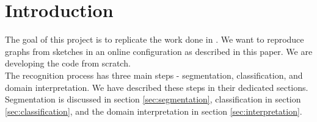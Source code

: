 \section{Introduction}

The goal of this project is to replicate the work done in \citeauthor{daly2015hand} \cite{daly2015hand}. We want to reproduce graphs from sketches in an online configuration as described in this paper. We are developing the code from scratch.\\

The recognition process has three main steps - segmentation, classification, and domain interpretation. We have described these steps in their dedicated sections. Segmentation is discussed in section \ref{sec:segmentation}, classification in section \ref{sec:classification}, and the domain interpretation in section \ref{sec:interpretation}.

%

